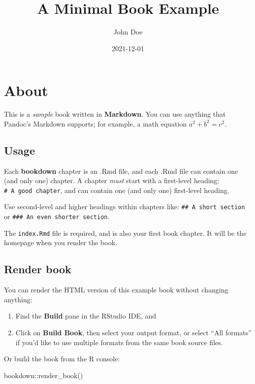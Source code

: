 \documentclass[
]{book}
\title{A Minimal Book Example}
\author{John Doe}
\date{2021-12-01}
\newenvironment{Shaded}{\begin{snugshade}}{\end{snugshade}}
\newcommand{\FunctionTok}[1]{\textcolor[rgb]{0.00,0.00,0.00}{#1}}
\newcommand{\NormalTok}[1]{#1}
\newcommand{\SpecialCharTok}[1]{\textcolor[rgb]{0.00,0.00,0.00}{#1}}
\begin{document}
\maketitle

{
\setcounter{tocdepth}{1}
\tableofcontents
}
\hypertarget{about}{%
\chapter{About}\label{about}}

This is a \emph{sample} book written in \textbf{Markdown}. You can use anything that Pandoc's Markdown supports; for example, a math equation \(a^2 + b^2 = c^2\).

\hypertarget{usage}{%
\section{Usage}\label{usage}}

Each \textbf{bookdown} chapter is an .Rmd file, and each .Rmd file can contain one (and only one) chapter. A chapter \emph{must} start with a first-level heading: \texttt{\#\ A\ good\ chapter}, and can contain one (and only one) first-level heading.

Use second-level and higher headings within chapters like: \texttt{\#\#\ A\ short\ section} or \texttt{\#\#\#\ An\ even\ shorter\ section}.

The \texttt{index.Rmd} file is required, and is also your first book chapter. It will be the homepage when you render the book.

\hypertarget{render-book}{%
\section{Render book}\label{render-book}}

You can render the HTML version of this example book without changing anything:

\begin{enumerate}
\def\labelenumi{\arabic{enumi}.}
\item
  Find the \textbf{Build} pane in the RStudio IDE, and
\item
  Click on \textbf{Build Book}, then select your output format, or select ``All formats'' if you'd like to use multiple formats from the same book source files.
\end{enumerate}

Or build the book from the R console:

\begin{Shaded}
\begin{Highlighting}[]
\NormalTok{bookdown}\SpecialCharTok{::}\FunctionTok{render\_book}\NormalTok{()}
\end{Highlighting}
\end{Shaded}
\end{document}
